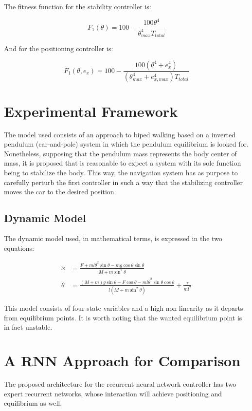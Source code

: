 The fitness function for the stability controller is:

\begin{equation}
F_1(\theta )=100-\frac{100\theta ^4}{\theta _{max}^4 T_{total}}
\end{equation}

And for the positioning controller is:

\begin{equation}
F_1(\theta ,e_x)=100-\frac{100(\theta ^4+e_x^4)}{(\theta _{max}^4+e_{x,max}^4) T_{total}}
\end{equation}


\section{Experimental Framework}
The model used consists of an approach to biped walking based on a
inverted pendulum (car-and-pole) system in which the pendulum equilibrium is looked
for. Nonetheless, supposing that the pendulum mass represents the body
center of mass, it is proposed that is reasonable to expect a system
with its sole function being to stabilize the body. This way, the
navigation system has as purpose to carefully perturb the first controller
in such a way that the stabilizing controller moves the car to the
desired position.

\subsection{Dynamic Model}
The dynamic model used, in mathematical terms, is expressed in the two
equations:

\begin{align}
\ddot{x}&=\frac{F+ml\dot{\theta}^2\sin\theta-mg\cos\theta\sin\theta}{M+m\sin^2\theta}\\
\ddot{\theta}&=\frac{(M+m)g\sin\theta-F\cos\theta-ml\dot{\theta}^2\sin\theta\cos\theta}{l(M+m\sin^2\theta)}+\frac{\tau}{ml^2}
\end{align} 

This model consists of four state variables and a high non-linearity
as it departs from equilibrium points. It is worth noting that the
wanted equilibrium point is in fact unstable.


\section{A RNN Approach for Comparison}
The proposed architecture for the recurrent neural network controller
has two expert recurrent networks, whose interaction will achieve
positioning and equilibrium as well.

